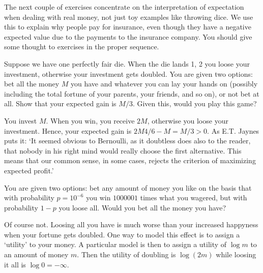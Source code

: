\documentclass[lectures]{subfiles}
\begin{document}
The next couple of exercises concentrate on the interpretation of expectation when dealing with real money, not just toy examples like throwing dice.
We use this to explain why people pay for insurance, even though they have a negative expected value due to the payments to the insurance company.
You should  give  some thought to exercises in the proper sequence.

\begin{exercise}
Suppose we have one perfectly fair die.
When the die lands 1, 2 you loose your investment, otherwise your investment gets doubled.
 You are given two options: bet all the money $M$ you have and whatever you can lay your hands on (possibly including the total fortune of your parents, your friends, and so on), or not bet at all.
Show that your expected gain is $M/3$.
Given this, would you play this game?
\begin{solution}
You invest $M$. When you win, you receive  $2M$, otherwise you loose your investment. Hence, your expected gain is $2 M 4/6 - M = M/3 > 0$.
As E.T.
Jaynes puts it: `It seemed obvious to Bernoulli, as it doubtless does also to the reader, that nobody in his right mind would really choose the first alternative.
This means that our common sense, in some cases, rejects the criterion of maximizing expected profit.'
\end{solution}
\end{exercise}

\begin{exercise}
You are given two options: bet any amount of  money you like on the basis that with probability $p=10^{-6}$ you win  $1 000 001$ times what you wagered, but with probability $1-p$ you loose all.
Would you bet all the money you have?
\begin{solution}
  Of course not.
  Loosing all you have is much worse than your increased happyness when your fortune gets doubled.
  One way to model this effect is to assign a `utility' to your money.
  A particular model is then to assign a utility of $\log m$ to an amount of money $m$. Then the  utility of doubling is $\log(2m)$ while loosing it all is $\log 0 = -\infty$.
\end{solution}
\end{exercise}
\end{document}
